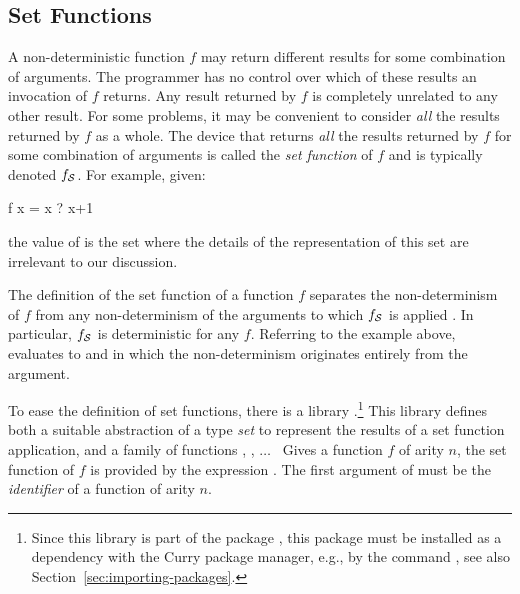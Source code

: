 \newcommand{\funset}[1]{#1\ensuremath{_{\cal S}}}
\subsection{Set Functions}
\label{Set Functions}

A non-deterministic function $f$ may return different results for
some combination of arguments.  The programmer has no control over
which of these results an invocation of $f$ returns.
Any result returned by $f$ is completely unrelated to any other result.
For some problems, it may be convenient to consider \emph{all}
the results returned by $f$ as a whole.
The device that returns \emph{all} the results returned by $f$
for some combination of arguments is called the \emph{set function} of $f$
and is typically denoted $\funset f$.
For example, given:
%
\begin{prog}
  f x = x ? x+1
\end{prog}
%
the value of \code{\funset{f} x} is the set 
where the details of the representation of this set are irrelevant to our
discussion.

The definition of the set function of a function $f$
separates the non-determinism of $f$ from any non-determinism
of the arguments to which $\funset{f}$ is applied \cite{AntoyHanus09PPDP}.
In particular, $\funset{f}$ is deterministic for any $f$.
Referring to the example above, \code{\funset{f} (2\,?\,4)} evaluates
to  and  in which the non-determinism
originates entirely from the argument.

To ease the definition of set functions,
there is a library
.\footnote{Since this library is
part of the package ,
this package must be installed as a dependency
with the Curry package manager, e.g., by the command
, see also
Section~\ref{sec:importing-packages}.}
This library defines both a suitable abstraction of a type \emph{set}
to represent the results of a set function application, and
a family of functions , , $\ldots$~
Gives a function $f$ of arity $n$,
the set function of $f$ is provided by the expression .
The first argument of  must be the \emph{identifier}
of a function of arity $n$.


